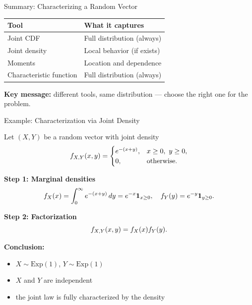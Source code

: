 \documentclass[aspectratio=169]{beamer}
\begin{document}
\begin{frame}{Summary: Characterizing a Random Vector}

\begin{center}
\begin{tabular}{ll}
\toprule
Tool & What it captures \\
\midrule
Joint CDF & Full distribution (always) \\
Joint density & Local behavior (if exists) \\
Moments & Location and dependence \\
Characteristic function & Full distribution (always) \\
\bottomrule
\end{tabular}
\end{center}

\medskip

\textbf{Key message:}  
different tools, same distribution — choose the right one for the problem.

\end{frame}

\begin{frame}{Example: Characterization via Joint Density}

Let \((X,Y)\) be a random vector with joint density
\[
f_{X,Y}(x,y)
=
\begin{cases}
e^{-(x+y)}, & x\ge0,\ y\ge0,\\
0, & \text{otherwise.}
\end{cases}
\vspace{-5mm}
\]
\pause
\medskip

\textbf{Step 1: Marginal densities}
\[
f_X(x)=\int_0^\infty e^{-(x+y)}\,dy = e^{-x}\mathbf{1}_{x\ge0},
\quad
f_Y(y)=e^{-y}\mathbf{1}_{y\ge0}.
\vspace{-5mm}
\]
\pause
\medskip

\textbf{Step 2: Factorization}
\[
f_{X,Y}(x,y)=f_X(x)f_Y(y).
\vspace{-9mm}
\]
\pause
\medskip

\textbf{Conclusion:}
\begin{itemize}
  \item \(X\sim \mathrm{Exp}(1)\), \(Y\sim \mathrm{Exp}(1)\)
  \item \(X\) and \(Y\) are independent
  \item the joint law is fully characterized by the density
\end{itemize}

\end{frame}
\end{document}
